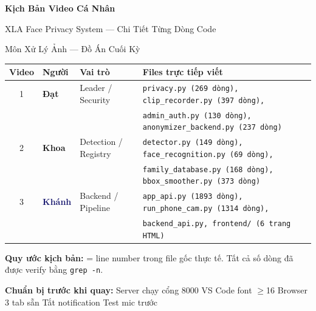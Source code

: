 \documentclass[12pt, a4paper]{article}
\begin{document}

\begin{titlepage}
\centering\vspace*{1cm}
{\Huge\bfseries\color{NavyBlue} Kịch Bản Video Cá Nhân\par}
{\Large\color{MidnightBlue} XLA Face Privacy System --- Chi Tiết Từng Dòng Code\par}
\vspace{0.3cm}
{\large\color{gray} Môn Xử Lý Ảnh --- Đồ Án Cuối Kỳ\par}
\vspace{1cm}

\begin{tcolorbox}[colback=NavyBlue!8, colframe=NavyBlue, width=0.95\textwidth]
\centering
\renewcommand{\arraystretch}{1.6}
\begin{tabular}{clll}
\toprule
\textbf{Video} & \textbf{Người} & \textbf{Vai trò} & \textbf{Files trực tiếp viết} \\
\midrule
1 & \textcolor{BrickRed}{\textbf{Đạt}} & Leader / Security &
  \texttt{privacy.py (269 dòng), clip\_recorder.py (397 dòng),} \\
  & & & \texttt{admin\_auth.py (130 dòng), anonymizer\_backend.py (237 dòng)} \\
2 & \textcolor{OliveGreen}{\textbf{Khoa}} & Detection / Registry &
  \texttt{detector.py (149 dòng), face\_recognition.py (69 dòng),} \\
  & & & \texttt{family\_database.py (168 dòng), bbox\_smoother.py (373 dòng)} \\
3 & \textcolor{MidnightBlue}{\textbf{Khánh}} & Backend / Pipeline &
  \texttt{app\_api.py (1893 dòng), run\_phone\_cam.py (1314 dòng),} \\
  & & & \texttt{backend\_api.py, frontend/ (6 trang HTML)} \\
\bottomrule
\end{tabular}
\end{tcolorbox}

\vspace{0.8cm}
{\small \textbf{Quy ước kịch bản:}
 = line number trong file gốc thực tế.
Tất cả số dòng đã được verify bằng \texttt{grep -n}.}
\vspace{0.6cm}

\begin{warn}
\textbf{Chuẩn bị trước khi quay:} Server chạy cổng 8000 \textbullet{}
VS Code font $\geq$16 \textbullet{} Browser 3 tab sẵn \textbullet{}
Tắt notification \textbullet{} Test mic trước
\end{warn}
\end{titlepage}
\end{document}
